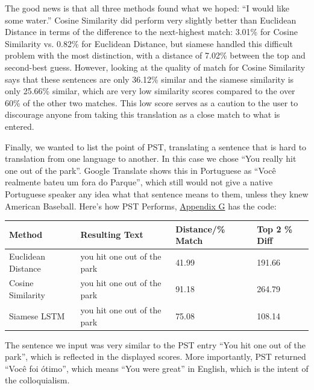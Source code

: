 \documentclass[runningheads]{llncs}
\begin{document}
	The good news is that all three methods found what we hoped: ``I would like some water.'' Cosine Similarity did perform very slightly better than Euclidean Distance in terms of the difference to the next-highest match: 3.01\% for Cosine Similarity vs. 0.82\% for Euclidean Distance, but siamese handled this difficult problem with the most distinction, with a distance of 7.02\% between the top and second-best guess. However, looking at the quality of match for Cosine Similarity says that these sentences are only 36.12\% similar and the siamese similarity is only 25.66\% similar, which are very low similarity scores compared to the over 60\% of the other two matches. This low score serves as a caution to the user to discourage anyone from taking this translation as a close match to what is entered.

	Finally, we wanted to list the point of PST, translating a sentence that is hard to translation from one language to another. In this case we chose ``You really hit one out of the park''. Google Translate shows this in Portuguese as ``Você realmente bateu um fora do Parque'', which still would not give a native Portuguese speaker any idea what that sentence means to them, unless they knew American Baseball. Here's how PST Performs, \hyperlink{Appendix G}{Appendix G} has the code:




	\begin{table} 
		\begin{center}
			\begin{tabular}{| l | l | l | l |}
			  \hline			
			  Method & Resulting Text & Distance/\% Match & Top 2 \% Diff \\
			  \hline			
			  Euclidean Distance & you hit one out of the park & 41.99 & 191.66 \\
			  \hline			
			  Cosine Similarity & you hit one out of the park & 91.18 & 264.79 \\
			  \hline  
			  Siamese LSTM & you hit one out of the park & 75.08 & 108.14 \\
			  \hline
			\end{tabular}
		\end{center}
		\label{table:``You Really Hit One Out of the Park'' Test}
	\end{table}

	The sentence we input was very similar to the PST entry ``You hit one out of the park'', which is reflected in the displayed scores. More importantly, PST returned ``Você foi ótimo'', which means ``You were great'' in English, which is the intent of the colloquialism. 
\end{document}
